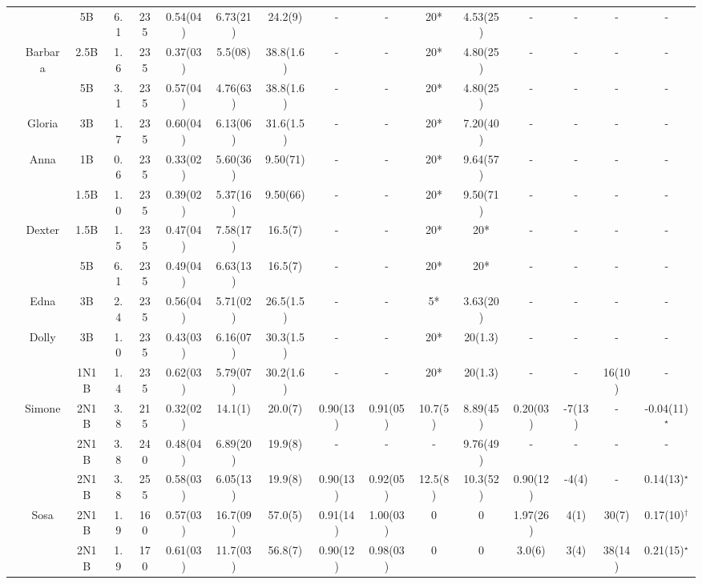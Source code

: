\documentclass[pdftex,letterpaper,12pt]{report}
\begin{document}
\begin{table}
\begin{center}
\begin{tabular}{|c|c|ccc|ccc|ccccc|cc|c|}
			& & 5B & 6.1 & 235 & 0.54(04) & 6.73(21) & 24.2(9) & - & - & 20* & 4.53(25) & - & - & - & - \\
			\cline{2-16}
			& \multirow{2}{*}{Barbara} & 2.5B & 1.6 & 235 & 0.37(03) & 5.5(08) & 38.8(1.6) & - & - & 20* & 4.80(25) & - & - & - & - \\
			& & 5B & 3.1 & 235 & 0.57(04) & 4.76(63) & 38.8(1.6) & - & - & 20* & 4.80(25) & - & - & - & - \\
			\cline{2-16}
			& Gloria & 3B & 1.7 & 235 & 0.60(04) & 6.13(06) & 31.6(1.5) & - & - & 20* & 7.20(40) & - & - & - & - \\
			\cline{2-16}
			& \multirow{2}{*}{Anna} & 1B & 0.6 & 235 & 0.33(02) & 5.60(36) & 9.50(71) & - & - & 20* & 9.64(57) & - & - & - & - \\
			& & 1.5B & 1.0 & 235 & 0.39(02) & 5.37(16) & 9.50(66) & - & - & 20* & 9.50(71) & - & - & - & - \\
			\cline{2-16}
			& \multirow{2}{*}{Dexter} & 1.5B & 1.5 & 235 & 0.47(04) & 7.58(17) & 16.5(7) & - & - & 20* & 20* & - & - & - & - \\
			& & 5B & 6.1 & 235 & 0.49(04) & 6.63(13) & 16.5(7) & - & - & 20* & 20* & - & - & - & - \\
			\cline{2-16}
			& Edna & 3B & 2.4 & 235 & 0.56(04) & 5.71(02) & 26.5(1.5) & - & - & 5* & 3.63(20) & - & - & - & - \\
			\cline{2-16}
			& \multirow{2}{*}{Dolly} & 3B & 1.0 & 235 & 0.43(03) & 6.16(07) & 30.3(1.5) & - & - & 20* & 20(1.3) & - & - & - & - \\
			& & 1N1B & 1.4 & 235 & 0.62(03) & 5.79(07) & 30.2(1.6) & - & - & 20* & 20(1.3) & - & - & 16(10) & - \\
			\cline{2-16}
			& \multirow{3}{*}{Simone} & 2N1B & 3.8 & 215 & 0.32(02) & 14.1(1) & 20.0(7) & 0.90(13)  & 0.91(05) & 10.7(5) & 8.89(45) & 0.20(03) & -7(13) & - & -0.04(11)$^\star$ \\
			& & 2N1B & 3.8 & 240 & 0.48(04) & 6.89(20) & 19.9(8) & - & - & - & 9.76(49) & - & - & - & - \\
			& & 2N1B & 3.8 & 255 & 0.58(03) & 6.05(13) & 19.9(8) & 0.90(13) & 0.92(05) & 12.5(8) & 10.3(52) & 0.90(12) & -4(4) & - & 0.14(13)$^\star$ \\
			\cline{2-16}
			& \multirow{5}{*}{Sosa} & 2N1B & 1.9 & 160 & 0.57(03) & 16.7(09) & 57.0(5) & 0.91(14) & 1.00(03) & 0 & 0 & 1.97(26) & 4(1) & 30(7) & 0.17(10)$^\dagger$ \\
			&  & 2N1B & 1.9 & 170 & 0.61(03) & 11.7(03) & 56.8(7) & 0.90(12) & 0.98(03) & 0 & 0 & 3.0(6) & 3(4) & 38(14) & 0.21(15)$^\star$ \\

\end{tabular}
\end{center}
\end{table}
\end{document}

